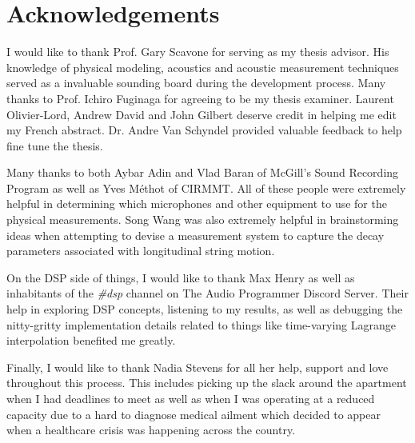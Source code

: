 \documentclass[../main.tex]{subfiles}
\begin{document}
\chapter*{Acknowledgements}
I would like to thank Prof. Gary Scavone for serving as my thesis advisor. His knowledge of physical modeling, acoustics and acoustic measurement techniques served as a invaluable sounding board during the development process. Many thanks to Prof. Ichiro Fuginaga for agreeing to be my thesis examiner. Laurent Olivier-Lord, Andrew David and John Gilbert deserve credit in helping me edit my French abstract. Dr. Andre Van Schyndel provided valuable feedback to help fine tune the thesis.

Many thanks to both Aybar Adin and Vlad Baran of McGill's Sound Recording Program as well as Yves Méthot of CIRMMT. All of these people were extremely helpful in determining which microphones and other equipment to use for the physical measurements. Song Wang was also extremely helpful in brainstorming ideas when attempting to devise a measurement system to capture the decay parameters associated with longitudinal string motion.

On the DSP side of things, I would like to thank Max Henry as well as inhabitants of the \emph{\#dsp} channel on The Audio Programmer Discord Server. Their help in exploring DSP concepts, listening to my results, as well as debugging the nitty-gritty implementation details related to things like time-varying Lagrange interpolation benefited me greatly.

Finally, I would like to thank Nadia Stevens for all her help, support and love throughout this process. This includes picking up the slack around the apartment when I had deadlines to meet as well as when I was operating at a reduced capacity due to a hard to diagnose medical ailment which decided to appear when a healthcare crisis was happening across the country.
\end{document}
